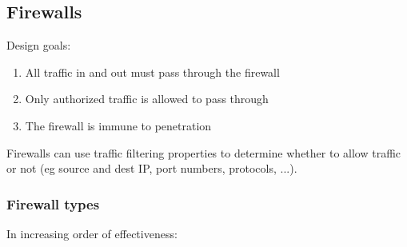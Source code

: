 \documentclass[12pt]{article}
\begin{document}
 \subsection{Firewalls}
 Design goals:
 \begin{enumerate}
 	\item All traffic in and out must pass through the firewall
 	\item Only authorized traffic is allowed to pass through
 	\item The firewall is immune to penetration
 \end{enumerate}
Firewalls can use traffic filtering properties to determine whether to allow traffic or not (eg source and dest IP, port numbers, protocols, ...).
 
 \subsubsection{Firewall types}
 In increasing order of effectiveness:
\end{document}
